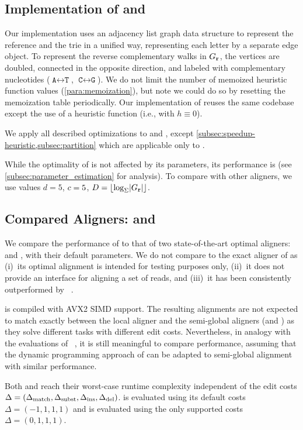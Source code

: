 \subsection{Implementation of \astarix and \dijkstra}
Our \astarix implementation uses an adjacency list graph data structure to
represent the reference and the trie in a unified way, representing each letter
by a separate edge object.
To represent the reverse complementary walks in $G_\texttt{r}$, the vertices are doubled,
connected in the opposite direction, and labeled with complementary nucleotides
($\texttt{A} \leftrightarrow \texttt{T}$, $\texttt{C} \leftrightarrow
\texttt{G}$).
%
We do not limit the number of memoized heuristic function values
(\cref{para:memoization}), but note we could do so by resetting the memoization
table periodically.
%
Our implementation of \dijkstra reuses the same \astarix codebase except the
use of a heuristic function (i.e., with $h \equiv 0$).

We apply all described optimizations to \astarix and \dijkstra, except
\cref{subsec:speedup-heuristic,subsec:partition} which are applicable only to
\astarix.

While the optimality of \astarix is not affected by its parameters, its
performance is (see \cref{subsec:parameter_estimation} for analysis). To compare
with other aligners, we use values \mbox{$d=5$}, \mbox{$c=5$}, \mbox{$D =
\lfloor \log_\Sigma \lvert G_\texttt{r} \rvert \rfloor$}.

\subsection{Compared Aligners: \pasgal and \bitparallel}

We compare the performance of \astarix to that of two state-of-the-art optimal
aligners: \pasgal and \bitparallel, with their default parameters.
%
We do not compare to the exact aligner of \vg as (i)~its optimal alignment
is intended for testing purposes only, (ii)~it does not provide an
interface for aligning a set of reads, and (iii)~it has been consistently
outperformed by \pasgal~\cite{jain_accelerating_2019}.

\pasgal is compiled with AVX2 SIMD support. The resulting alignments are not
expected to match exactly between the local aligner \pasgal and the semi-global
aligners (\astarix and \bitparallel) as they solve different tasks with
different edit costs. Nevertheless, in analogy with the evaluations of
\pasgal~\cite{jain_accelerating_2019}, it is still meaningful to compare
performance, assuming that the dynamic programming approach of \pasgal can be
adapted to semi-global alignment with similar performance.

Both \bitparallel and \pasgal reach their worst-case runtime complexity
independent of the edit costs $\Delta=(\Delta_\text{match},\Delta_\text{subst},\Delta_\text{ins},\Delta_\text{del})$. \pasgal is
evaluated using its default costs ~$\Delta=(-1,1,1,1)$ and \bitparallel is
evaluated using the only supported costs~$\Delta=(0,1,1,1)$.

